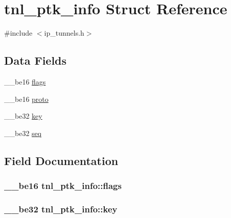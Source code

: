 \hypertarget{structtnl__ptk__info}{}\section{tnl\+\_\+ptk\+\_\+info Struct Reference}
\label{structtnl__ptk__info}


{\ttfamily \#include $<$ip\+\_\+tunnels.\+h$>$}

\subsection*{Data Fields}
\begin{DoxyCompactItemize}
\item 
\+\_\+\+\_\+be16 \hyperlink{structtnl__ptk__info_ace5a0170111f2d302e1cc4ed93d6ecad}{flags}
\item 
\+\_\+\+\_\+be16 \hyperlink{structtnl__ptk__info_ac4f408097c387edf64653942d355985f}{proto}
\item 
\+\_\+\+\_\+be32 \hyperlink{structtnl__ptk__info_a6c32868baa4f56abb6c81edde446a567}{key}
\item 
\+\_\+\+\_\+be32 \hyperlink{structtnl__ptk__info_ac8158dad50d130f9292c406776cce767}{seq}
\end{DoxyCompactItemize}


\subsection{Field Documentation}
\hypertarget{structtnl__ptk__info_ace5a0170111f2d302e1cc4ed93d6ecad}{}
\subsubsection[{flags}]{\setlength{\rightskip}{0pt plus 5cm}\+\_\+\+\_\+be16 tnl\+\_\+ptk\+\_\+info\+::flags}\label{structtnl__ptk__info_ace5a0170111f2d302e1cc4ed93d6ecad}
\hypertarget{structtnl__ptk__info_a6c32868baa4f56abb6c81edde446a567}{}
\subsubsection[{key}]{\setlength{\rightskip}{0pt plus 5cm}\+\_\+\+\_\+be32 tnl\+\_\+ptk\+\_\+info\+::key}\label{structtnl__ptk__info_a6c32868baa4f56abb6c81edde446a567}
\hypertarget{structtnl__ptk__info_ac4f408097c387edf64653942d355985f}{}
